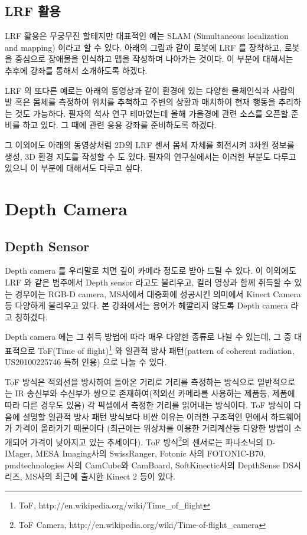 \subsection{LRF 활용}

LRF 활용은 무궁무진 할테지만 대표적인 예는 SLAM (Simultaneous localization and mapping) 이라고 할 수 있다. 아래의 그림과 같이 로봇에 LRF 를 장착하고, 로봇을 중심으로 장애물을 인식하고 맵을 작성하며 나아가는 것이다. 이 부분에 대해서는 추후에 강좌를 통해서 소개하도록 하겠다.

LRF 의 또다른 예로는 아래의 동영상과 같이 환경에 있는 다양한 물체인식과 사람의 발 혹은 몸체를 측정하여 위치를 추척하고 주변의 상황과 매치하여 현재 행동을 추리하는 것도 가능하다. 필자의 석사 연구 테마였는데 올해 가을경에 관련 소스를 오픈할 준비를 하고 있다. 그 때에 관련 응용 강좌를 준비하도록 하겠다.

그 이외에도 아래의 동영상처럼 2D의 LRF 센서 몸체 자체를 회전시켜 3차원 정보를 생성, 3D 환경 지도를 작성할 수 도 있다. 필자의 연구실에서는 이러한 부분도 다루고 있으니 이 부분에 대해서도 다루고 싶다.

\section{Depth Camera}

\subsection{Depth Sensor}

Depth camera 를 우리말로 치면 깊이 카메라 정도로 받아 드릴 수 있다. 이 이외에도 LRF 와 같은 범주에서 Depth sensor 라고도 불리우고, 컬러 영상과 함께 취득할 수 있는 경우에는 RGB-D camera, MS사에서 대중화에 성공시킨 의미에서 Kinect Camera 등 다양하게 불리우고 있다. 본 강좌에서는 용어가 헤깔리지 않도록 Depth camera 라고 칭하겠다.

Depth camera 에는 그 취득 방법에 따라 매우 다양한 종류로 나뉠 수 있는데, 그 중 대표적으로 ToF(Time of flight)\footnote{ToF, http://en.wikipedia.org/wiki/Time\_of\_flight} 와 일관적 방사 패턴(pattern of coherent radiation, US20100225746 특허 인용) 으로 나눌 수 있다.

ToF 방식은 적외선을 방사하여 돌아온 거리로 거리를 측정하는 방식으로 일반적으로는 IR 송신부와 수신부가 쌍으로 존재하여(적외선 카메라를 사용하는 제품등, 제품에 따라 다른 경우도 있음) 각 픽셀에서 측정한 거리를 읽어내는 방식이다. ToF 방식이 다음에 설명할 일관적 방사 패턴 방식보다 비싼 이유는 이러한 구조적인 면에서 하드웨어가 가격이 올라가기 때문이다 (최근에는 위상차를 이용한 거리계산등 다양한 방법이 소개되어 가격이 낮아지고 있는 추세이다). ToF 방식\footnote{ToF Camera, http://en.wikipedia.org/wiki/Time-of-flight\_camera}의 센서로는 파나소닉의 D-IMager, MESA Imaging사의 SwissRanger, Fotonic 사의 FOTONIC-B70, pmdtechnologies 사의 CamCube와 CamBoard, SoftKinectic사의 DepthSense DS시리즈, MS사의 최근에 출시한 Kinect 2 등이 있다.


